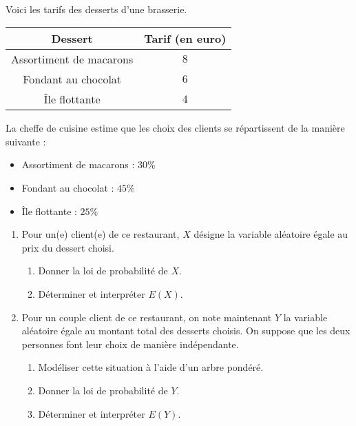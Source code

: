 \documentclass[11pt]{article}
\begin{document}
\begin{exo}[$4$ points]~\\
\begin{minipage}[t]{.5\textwidth}
Voici les tarifs des desserts d'une brasserie.
\begin{center}
\renewcommand{\arraystretch}{1.5}
\begin{tabular}{cc}
  \toprule
  \textbf{Dessert} & \textbf{Tarif (en euro)} \\ \midrule
  Assortiment de macarons & $8$ \\
  Fondant au chocolat & $6$ \\
  Île flottante & $4$ \\ \bottomrule
\end{tabular}
\end{center}
\end{minipage}
\begin{minipage}[t]{.5\textwidth}
La cheffe de cuisine estime que les choix des clients se répartissent de la
manière suivante :
\begin{itemize}
  \item Assortiment de macarons : $30$\%
  \item Fondant au chocolat : $45$\%
  \item Île flottante : $25$\%
\end{itemize}
\end{minipage}
\begin{enumerate}
  \item Pour un(e) client(e) de ce restaurant, $X$ désigne la variable aléatoire égale
    au prix du dessert choisi.
    \begin{enumerate}
      \item Donner la loi de probabilité de $X$.
      \item Déterminer et interpréter $E(X)$.
    \end{enumerate}
  \item Pour un couple client de ce restaurant, on note maintenant $Y$ la
    variable aléatoire égale au montant total des desserts choisis. On suppose
    que les deux personnes font leur choix de manière indépendante.
    \begin{enumerate}
      \item Modéliser cette situation à l'aide d'un arbre pondéré.
      \item Donner la loi de probabilité de $Y$.
      \item Déterminer et interpréter $E(Y)$.
    \end{enumerate}

\end{enumerate}
\end{exo}
\end{document}
